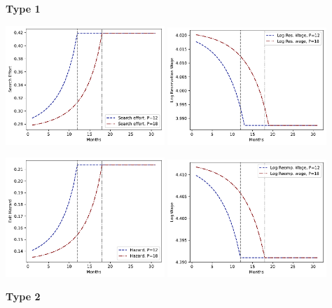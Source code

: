 \documentclass[letter, 10pt]{article}
\begin{document}
\pagebreak 
 \textbf{Type 1} 
 
\includegraphics[clip=true,trim=0cm 0cm 0cm 0cm,width = 0.45\textwidth]{figures_Est1_compiled/fig_type1_s.pdf} 
\includegraphics[clip=true,trim=0cm 0cm 0cm 0cm,width = 0.45\textwidth]{figures_Est1_compiled/fig_type1_phi.pdf} 

\includegraphics[clip=true,trim=0cm 0cm 0cm 0cm,width = 0.45\textwidth]{figures_Est1_compiled/fig_type1_hazard.pdf} 
\includegraphics[clip=true,trim=0cm 0cm 0cm 0cm,width = 0.45\textwidth]{figures_Est1_compiled/fig_type1_w.pdf} 

\pagebreak 
 \textbf{Type 2} 
 
\end{document}
